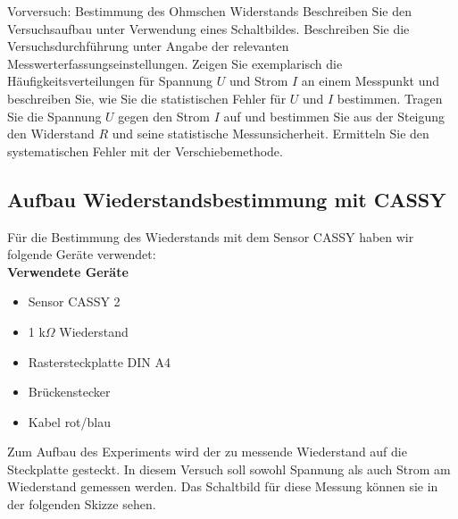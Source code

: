 \documentclass[twoside]{protokoll}
\begin{document}
\begin{aufgabe}{Vorversuch: Bestimmung des Ohmschen Widerstands}
  Beschreiben Sie den Versuchsaufbau unter Verwendung eines
  Schaltbildes. Beschreiben Sie die Versuchsdurchführung unter Angabe
  der relevanten Messwerterfassungseinstellungen. Zeigen Sie
  exemplarisch die Häufigkeitsverteilungen für Spannung $U$ und Strom
  $I$ an einem Messpunkt und beschreiben Sie, wie Sie die
  statistischen Fehler für $U$ und $I$ bestimmen. Tragen Sie die
  Spannung $U$ gegen den Strom $I$ auf und bestimmen Sie aus der
  Steigung den Widerstand $R$ und seine statistische
  Messunsicherheit. Ermitteln Sie den systematischen Fehler mit der
  Verschiebemethode.\\
  
  \subsection{Aufbau Wiederstandsbestimmung mit CASSY}
  
  Für die Bestimmung des Wiederstands mit dem Sensor CASSY haben wir folgende Geräte verwendet:\\
  
  \textbf{Verwendete Geräte}
  
  \begin{itemize}
  
  \item Sensor CASSY 2
  \item 1 k$\Omega$ Wiederstand
  \item Rastersteckplatte DIN A4
  \item Brückenstecker
  \item Kabel rot/blau
  \end{itemize}
  
Zum Aufbau des Experiments wird der zu messende Wiederstand auf die Steckplatte gesteckt. 
In diesem Versuch soll sowohl Spannung als auch Strom am Wiederstand gemessen werden. Das Schaltbild für diese Messung können sie in der folgenden Skizze sehen. \\


\end{aufgabe}
\end{document}
